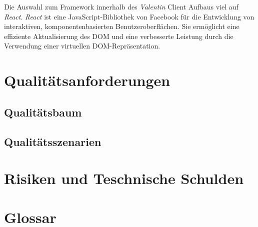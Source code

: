 \documentclass[
]{article}
\begin{document}
Die Auswahl zum Framework innerhalb des \textit{Valentin} Client Aufbaus viel auf \textit{React}. \textit{React} ist eine JavaScript-Bibliothek von Facebook für die Entwicklung von interaktiven, komponentenbasierten Benutzeroberflächen. Sie ermöglicht eine effiziente Aktualisierung des DOM und eine verbesserte Leistung durch die Verwendung einer virtuellen DOM-Repräsentation.

\section{Qualitätsanforderungen}
\subsection{Qualitätsbaum}
\subsection{Qualitätsszenarien}

\section{Risiken und Teschnische Schulden}
\section{Glossar}
\end{document}
